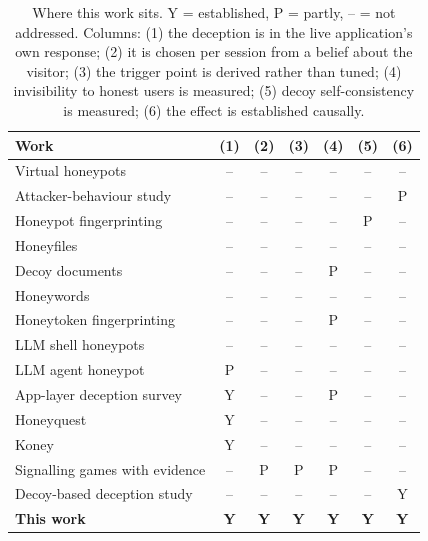 \begin{table}[t]
\centering
\small
\setlength{\tabcolsep}{4pt}
\caption{Where this work sits. Y = established, P = partly, -- = not addressed. Columns: (1) the deception is in the live application's own response; (2) it is chosen per session from a belief about the visitor; (3) the trigger point is derived rather than tuned; (4) invisibility to honest users is measured; (5) decoy self-consistency is measured; (6) the effect is established causally.}
\label{tab:positioning}
\begin{tabular}{lcccccc}
\toprule
Work & (1) & (2) & (3) & (4) & (5) & (6) \\
\midrule
Virtual honeypots \cite{provos2004honeyd} & -- & -- & -- & -- & -- & -- \\
Attacker-behaviour study \cite{barron2017picky} & -- & -- & -- & -- & -- & P \\
Honeypot fingerprinting \cite{vetterl2018bitter} & -- & -- & -- & -- & P & -- \\
Honeyfiles \cite{yuill2004honeyfiles} & -- & -- & -- & -- & -- & -- \\
Decoy documents \cite{bowen2009baiting} & -- & -- & -- & P & -- & -- \\
Honeywords \cite{juels2013honeywords} & -- & -- & -- & -- & -- & -- \\
Honeytoken fingerprinting \cite{srinivasa2020honeytoken} & -- & -- & -- & P & -- & -- \\
LLM shell honeypots \cite{sladic2024shellm} & -- & -- & -- & -- & -- & -- \\
LLM agent honeypot \cite{reworr2024llmagent} & P & -- & -- & -- & -- & -- \\
App-layer deception survey \cite{kahlhofer2024applayer} & Y & -- & -- & P & -- & -- \\
Honeyquest \cite{kahlhofer2024honeyquest} & Y & -- & -- & -- & -- & -- \\
Koney \cite{kahlhofer2025koney} & Y & -- & -- & -- & -- & -- \\
Signalling games with evidence \cite{pawlick2019leaky} & -- & P & P & P & -- & -- \\
Decoy-based deception study \cite{fergusonwalter2021examining} & -- & -- & -- & -- & -- & Y \\
\midrule
\textbf{This work} & \textbf{Y} & \textbf{Y} & \textbf{Y} & \textbf{Y} & \textbf{Y} & \textbf{Y} \\
\bottomrule
\end{tabular}
\end{table}